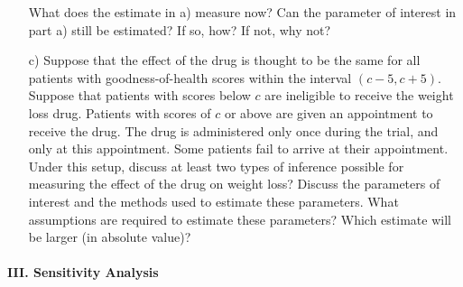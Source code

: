 \documentclass{article}
\begin{document}
\begin{itemize}
          What does the estimate in a) measure now?
          Can the parameter of interest in part a) still be estimated?
          If so, how?  If not, why not?
        \item[c)]
          Suppose that the effect of the drug is thought to be the same
          for all patients with goodness-of-health scores within the interval
          $(c-5,c+5)$.
          Suppose that patients with scores below $c$ 
          are ineligible to receive the weight loss drug.
          Patients with scores of $c$ or above are given an appointment to receive 
          the drug.
          The drug is administered only once during the trial, and only at this appointment.
          Some patients fail to arrive at their appointment.
          Under this setup,
          discuss at least two types of inference 
          possible for measuring the effect of the drug on weight loss? 
          Discuss the parameters of interest and the methods used to estimate these parameters.
          What assumptions are required to estimate these parameters?
          Which estimate will be larger (in absolute value)?
      \end{itemize}

\paragraph{\Large III. Sensitivity Analysis \\ \\}
\end{document}
